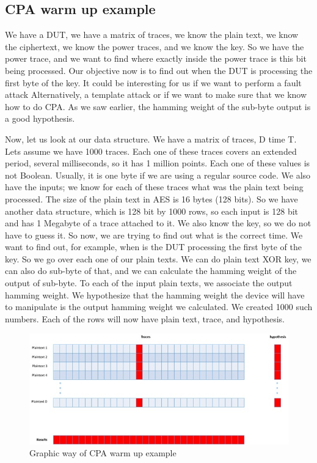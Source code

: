 \subsection{CPA warm up example}\label{c8_CPA_warm_up_example:subsec}

We have a DUT, we have a matrix of traces, we know the plain text, we know the
ciphertext, we know the power traces, and we know the key. So we have the power
trace, and we want to find where exactly inside the power trace is this bit being
processed. Our objective now is to find out when the DUT is processing the first
byte of the key. It could be interesting for us if we want to perform a fault attack \cite{FaultAttack}
Alternatively, a template attack \cite{TemplateAttack} or if we want to make sure that we know how to do CPA.
As we saw earlier, the hamming weight of the sub-byte output is a good
hypothesis.

Now, let us look at our data structure. We have a matrix of traces, D time T.
Lets assume we have 1000 traces. Each one of these traces covers an extended period, several milliseconds, so it has 1 million points. Each one of these values
is not Boolean. Usually, it is one byte if we are using a regular source code. We
also have the inputs; we know for each of these traces what was the plain
text being processed. The size of the plain text in AES is 16 bytes (128 bits).
So we have another data structure, which is 128 bit by 1000 rows, so each input
is 128 bit and has 1 Megabyte of a trace attached to it. We also know the key, so we
do not have to guess it. So now, we are trying to find out what is the correct
time. We want to find out, for example, when is the DUT processing the first byte
of the key. So we go over each one of our plain texts. We can do plain text XOR
key, we can also do sub-byte of that, and we can calculate the hamming weight of the output
of sub-byte. To each of the input plain texts, we associate the output hamming
weight. We hypothesize that the hamming weight the device will have to
manipulate is the output hamming weight we calculated. We created 1000 such
numbers. Each of the rows will now have plain text, trace, and hypothesis.

\begin{figure}[!ht]
    \centering
    \includegraphics[width=1.0\textwidth]{images/chapter8/cpa_warmup_example.jpg}
    \caption{Graphic way of CPA warm up example} \label{c8_cpa_warmup_example:fig}
\end{figure}

